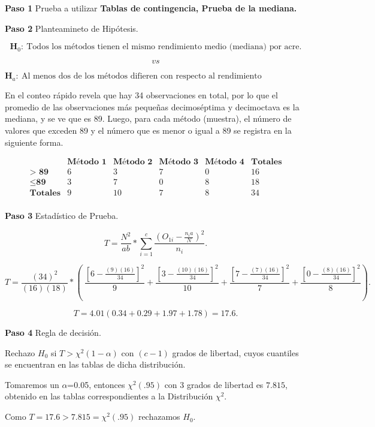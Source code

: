 \documentclass[
  a4paper,
  oneside,
  openany]{book}
\begin{document}
\textbf{Paso 1} Prueba a utilizar \textbf{Tablas de contingencia, Prueba de la mediana.}

\textbf{Paso 2} Planteamineto de Hipótesis.

\[\textbf{H}_0: \ \mbox{Todos los métodos tienen el mismo rendimiento medio (mediana) por acre.}\]

\[vs\]

\[\textbf{H}_a: \ \mbox{Al menos dos de los métodos difieren con respecto al rendimiento medio(mediana) por acre.}\]

En el conteo rápido revela que hay 34 observaciones en total, por lo que el promedio de las observaciones más pequeñas decimoséptima y decimoctava es la mediana, y se ve que es 89. Luego, para cada método (muestra), el número de valores que exceden 89 y el número que es menor o igual a 89 se registra en la siguiente forma.

\[
\begin{array}{c|c|c|c|c|c}
 & \textbf{Método 1} & \textbf{Método 2} & \textbf{Método 3} & \textbf{Método 4}& \textbf{Totales} \\
\hline
\textbf{> 89} & 6 & 3 & 7 & 0 & 16  \\
\hline
\leq \textbf{89} & 3 & 7 & 0 & 8 & 18\\
\hline
\textbf{Totales}  & 9  & 10  & 7 & 8  & 34 \\
\end{array}
\]

\textbf{Paso 3} Estadístico de Prueba.

\[T=\frac{N^2}{ab}*\sum^{c}_{i=1}\frac{(O_{1i}-\frac{n_{i}a}{N})^2}{n_i}.\]

\[T=\frac{(34)^2}{(16)(18)}*\left(\ \frac{\left[6-\frac{(9)(16)}{34}\right]^2}{9}+\frac{\left[3-\frac{(10)(16)}{34}\right]^2}{10}+\frac{\left[7-\frac{(7)(16)}{34}\right]^2}{7}+\frac{\left[0-\frac{(8)(16)}{34}\right]^2}{8} \right).\]

\[T=4.01(0.34+0.29+1.97+1.78) = 17.6.\]

\textbf{Paso 4} Regla de decisión.

Rechazo \(H_0\) si \(T> \chi^2(1-\alpha)\) con \((c-1)\) grados de libertad, cuyos cuantiles se encuentran en las tablas de dicha distribución.

Tomaremos un \(\alpha\)=0.05, entonces \(\chi^2(.95)\) con 3 grados de libertad es \(7.815\), obtenido en las tablas correspondientes a la Distribución \(\chi^2\).

Como \(T=17.6 > 7.815=\chi^2(.95)\) rechazamos \(H_0\).
\end{document}
